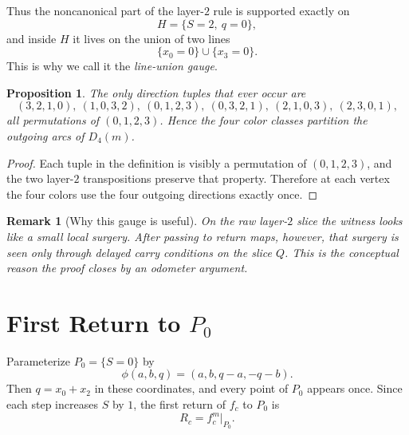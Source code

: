 \documentclass[11pt]{article}
\newtheorem{proposition}[theorem]{Proposition}
\newtheorem{remark}[theorem]{Remark}
\newcommand{\Pzero}{P_0}
\newcommand{\Qslice}{Q}
\begin{document}
Thus the noncanonical part of the layer-$2$ rule is supported exactly on
\[
H=\{S=2,\ q=0\},
\]
and inside $H$ it lives on the union of two lines
\[
\{x_0=0\} \cup \{x_3=0\}.
\]
This is why we call it the \emph{line-union gauge}.

\begin{proposition}\label{prop:tuples}
The only direction tuples that ever occur are
\[
(3,2,1,0),\ (1,0,3,2),\ (0,1,2,3),\ (0,3,2,1),\ (2,1,0,3),\ (2,3,0,1),
\]
all permutations of $(0,1,2,3)$. Hence the four color classes partition the
outgoing arcs of $D_4(m)$.
\end{proposition}

\begin{proof}
Each tuple in the definition is visibly a permutation of $(0,1,2,3)$, and the
two layer-$2$ transpositions preserve that property. Therefore at each vertex the
four colors use the four outgoing directions exactly once.
\end{proof}

\begin{remark}[Why this gauge is useful]
On the raw layer-$2$ slice the witness looks like a small local surgery. After
passing to return maps, however, that surgery is seen only through delayed carry
conditions on the slice $\Qslice$. This is the conceptual reason the proof closes
by an odometer argument.
\end{remark}

\section{First Return to \texorpdfstring{$\Pzero$}{P0}}\label{sec:first-return}

Parameterize $\Pzero=\{S=0\}$ by
\[
\phi(a,b,q)=(a,b,q-a,-q-b).
\]
Then $q=x_0+x_2$ in these coordinates, and every point of $\Pzero$ appears once.
Since each step increases $S$ by $1$, the first return of $f_c$ to $\Pzero$ is
\[
R_c=f_c^m\big|_{\Pzero}.
\]
\end{document}
